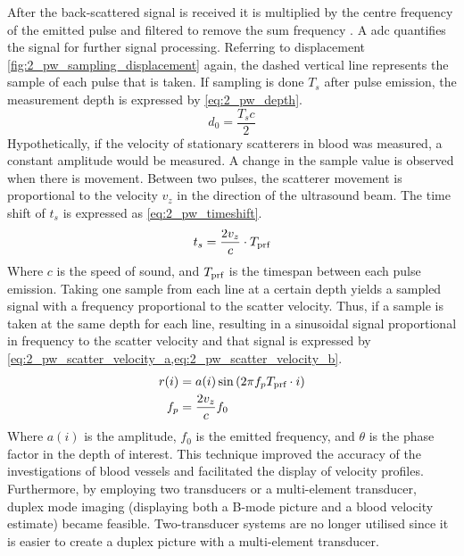 After the back-scattered signal is received it is multiplied by the centre frequency of the emitted pulse and filtered to remove the sum frequency \cite{JensenUltrasoundBook}. A \gls{adc} quantifies the signal for further signal processing. Referring to displacement \cref{fig:2_pw_sampling_displacement} again, the dashed vertical line represents the sample of each pulse that is taken. If sampling is done $T_{s}$ after pulse emission, the measurement depth is expressed by \cref{eq:2_pw_depth}.
\begin{equation} \label{eq:2_pw_depth}
	d_{0} = \frac{T_{s}c}{2}
\end{equation}
Hypothetically, if the velocity of stationary scatterers in blood was measured, a constant amplitude would be measured. A change in the sample value is observed when there is movement. Between two pulses, the scatterer movement is proportional to the velocity $v_{z}$ in the direction of the ultrasound beam. The time shift of $t_{s}$ is expressed as \cref{eq:2_pw_timeshift}.
\begin{equation} \label{eq:2_pw_timeshift}
	t_{s} = \frac{2v_{z}}{c}\cdot T_{\textup{prf}}
\end{equation}
Where $c$ is the speed of sound, and $T_{\textup{prf}}$ is the timespan between each pulse emission. Taking one sample from each line at a certain depth yields a sampled signal with a frequency proportional to the scatter velocity. Thus, if a sample is taken at the same depth for each line, resulting in a sinusoidal signal proportional in frequency to the scatter velocity \cite{Munk_Thesis} and that signal is expressed by \cref{eq:2_pw_scatter_velocity_a,eq:2_pw_scatter_velocity_b}.
\begin{subequations}
	\begin{align} 
		r(i) &= a(i) \sin \left( 2\pi f_{p} T_{\textup{prf}} \cdot i \right) \label{eq:2_pw_scatter_velocity_a} \\
		f_{p} &= \frac{2 v_{z}}{c} f_{0} \label{eq:2_pw_scatter_velocity_b}
	\end{align}
\end{subequations}
Where $a(i)$ is the amplitude, $f_{0}$ is the emitted frequency, and $\theta$ is the phase factor in the depth of interest.  This technique improved the accuracy of the investigations of blood vessels and facilitated the display of velocity profiles. Furthermore, by employing two transducers or a multi-element transducer, duplex mode imaging (displaying both a B-mode picture and a blood velocity estimate) became feasible. Two-transducer systems are no longer utilised since it is easier to create a duplex picture with a multi-element transducer. 

